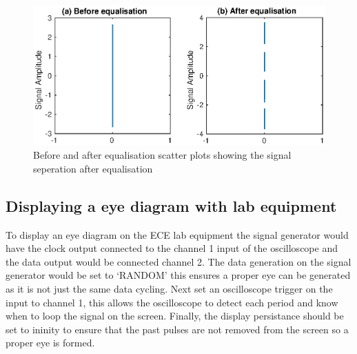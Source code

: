 \begin{figure}[H]
    \begin{center}
        \includegraphics{Equaliser/scatter}
    \end{center}
    \caption{Before and after equalisation scatter plots showing the signal seperation after equalisation}
    \label{fig:equ-scatter}
\end{figure}

\subsection{Displaying a eye diagram with lab equipment}
To display an eye diagram on the ECE lab equipment the signal generator would have the clock output connected to the channel 1
input of the oscilloscope and the data output would be connected channel 2. The data generation on the signal generator would
be set to `RANDOM' this ensures a proper eye can be generated as it is not just the same data cycling. Next set an oscilloscope
trigger on the input to channel 1, this allows the oscilloscope to detect each period and know when to loop the signal on the screen.
Finally, the display persistance should be set to ininity to ensure that the past pulses are not removed from the screen so a proper
eye is formed.
